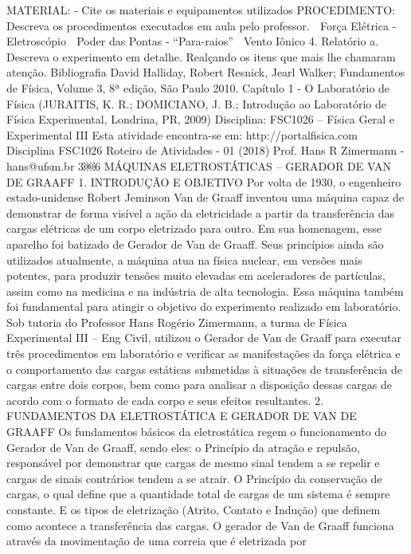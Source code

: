 MATERIAL:
- Cite os materiais e equipamentos utilizados
PROCEDIMENTO:
Descreva os procedimentos executados em aula pelo professor.
 Força Elétrica - Eletroscópio
 Poder das Pontas - “Para-raios”
 Vento Iônico
4. Relatório
a. Descreva o experimento em detalhe. Realçando os itens que mais lhe chamaram atenção.
Bibliografia
David Halliday, Robert Resnick, Jearl Walker; Fundamentos de Física, Volume 3, 8ª edição, São Paulo 2010.
Capítulo 1 - O Laboratório de Física (JURAITIS, K. R.; DOMICIANO, J. B.; Introdução ao 
Laboratório de Física Experimental, Londrina, PR, 2009)
Disciplina: FSC1026 – Física Geral e Experimental III
Esta atividade encontra-se em: http://portalfisica.com Disciplina FSC1026
Roteiro de Atividades - 01 (2018) 
Prof. Hans R Zimermann - hans@ufsm.br
3￼6
MÁQUINAS ELETROSTÁTICAS – GERADOR DE VAN DE GRAAFF
1. INTRODUÇÃO E OBJETIVO
Por volta de 1930, o engenheiro estado-unidense Robert Jeminson Van de Graaff inventou uma 
máquina capaz de demonstrar de forma visível a ação da eletricidade a partir da transferência das 
cargas elétricas de um corpo eletrizado para outro. Em sua homenagem, esse aparelho foi batizado
de Gerador de Van de Graaff. Seus princípios ainda são utilizados atualmente, a máquina atua na 
física nuclear, em versões mais potentes, para produzir tensões muito elevadas em aceleradores de 
partículas, assim como na medicina e na indústria de alta tecnologia.
Essa máquina também foi fundamental para atingir o objetivo do experimento realizado em 
laboratório. Sob tutoria do Professor Hans Rogério Zimermann, a turma de Física Experimental III –
Eng Civil, utilizou o Gerador de Van de Graaff para executar três procedimentos em laboratório e 
verificar as manifestações da força elétrica e o comportamento das cargas estáticas submetidas à 
situações de transferência de cargas entre dois corpos, bem como para analisar a disposição dessas 
cargas de acordo com o formato de cada corpo e seus efeitos resultantes.
2. FUNDAMENTOS DA ELETROSTÁTICA E GERADOR DE VAN DE GRAAFF
Os fundamentos básicos da eletrostática regem o funcionamento do Gerador de Van de Graaff, 
sendo eles: o Princípio da atração e repulsão, responsável por demonstrar que cargas de mesmo 
sinal tendem a se repelir e cargas de sinais contrários tendem a se atrair. O Princípio da conservação 
de cargas, o qual define que a quantidade total de cargas de um sistema é sempre constante. E os 
tipos de eletrização (Atrito, Contato e Indução) que definem como acontece a transferência das 
cargas.
O gerador de Van de Graaff funciona através da movimentação de uma correia que é eletrizada por 
